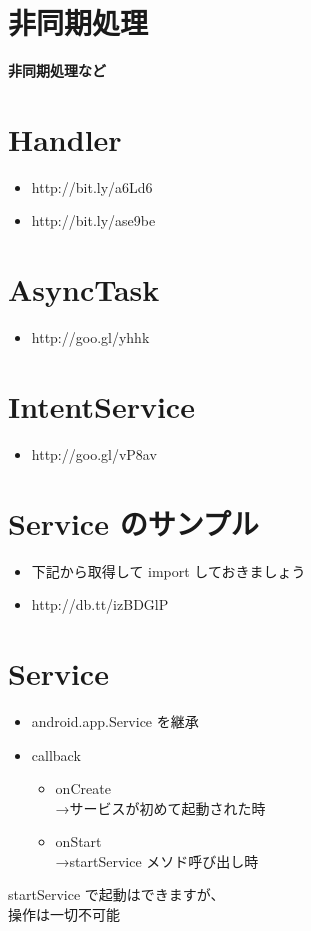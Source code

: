 \documentclass[slide,papersize]{jsarticle}
\begin{document}
\section*{非同期処理}
\vspace*{15mm}
\begin{center}
{\Huge {\bf 非同期処理など}}
\end{center}

\section*{Handler}
\bigskip
\begin{itemize}
\item http://bit.ly/a6Ld6
\bigskip
\item http://bit.ly/ase9be
\end{itemize}

\section*{AsyncTask}
\bigskip
\begin{itemize}
\item http://goo.gl/yhhk
\end{itemize}

\section*{IntentService}
\bigskip
\begin{itemize}
\item http://goo.gl/vP8av
\end{itemize}

\section*{Service のサンプル}
\bigskip
\begin{itemize}
\item 下記から取得して import しておきましょう
\bigskip
\item http://db.tt/izBDGlP
\end{itemize}


\section*{Service}
\smallskip
\begin{itemize}
\item android.app.Service を継承
\smallskip
\item callback
 \begin{itemize}
 \item onCreate \\→サービスが初めて起動された時
 \item onStart \\→startService メソド呼び出し時
 \end{itemize}
\end{itemize}
startService で起動はできますが、\\操作は一切不可能
\end{document}
